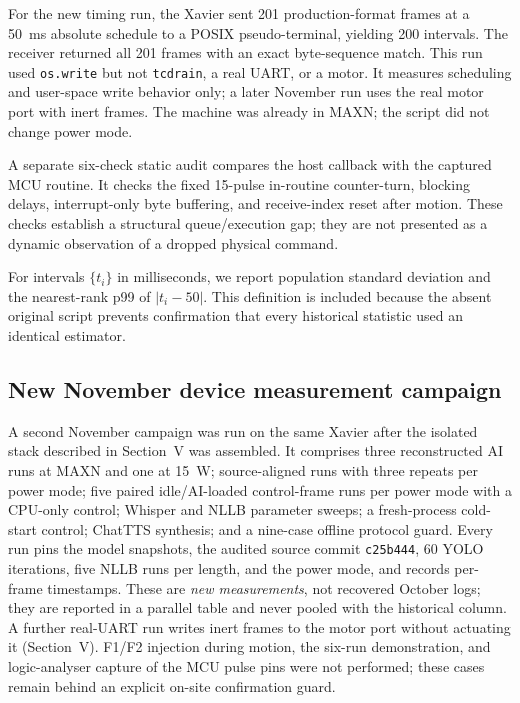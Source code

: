\documentclass[conference]{IEEEtran}
\newcommand{\code}[1]{\texttt{#1}}
\begin{document}
For the new timing run, the Xavier sent 201 production-format frames at a 50~ms absolute schedule to a POSIX pseudo-terminal, yielding 200 intervals. The receiver returned all 201 frames with an exact byte-sequence match. This run used \code{os.write} but not \code{tcdrain}, a real UART, or a motor. It measures scheduling and user-space write behavior only; a later November run uses the real motor port with inert frames. The machine was already in MAXN; the script did not change power mode.

A separate six-check static audit compares the host callback with the captured MCU routine. It checks the fixed 15-pulse in-routine counter-turn, blocking delays, interrupt-only byte buffering, and receive-index reset after motion. These checks establish a structural queue/execution gap; they are not presented as a dynamic observation of a dropped physical command.

For intervals $\{t_i\}$ in milliseconds, we report population standard deviation and the nearest-rank p99 of $|t_i-50|$. This definition is included because the absent original script prevents confirmation that every historical statistic used an identical estimator.

\subsection{New November device measurement campaign}
A second November campaign was run on the same Xavier after the isolated stack described in Section~V was assembled. It comprises three reconstructed AI runs at MAXN and one at 15~W; source-aligned runs with three repeats per power mode; five paired idle/AI-loaded control-frame runs per power mode with a CPU-only control; Whisper and NLLB parameter sweeps; a fresh-process cold-start control; ChatTTS synthesis; and a nine-case offline protocol guard. Every run pins the model snapshots, the audited source commit \code{c25b444}, 60 YOLO iterations, five NLLB runs per length, and the power mode, and records per-frame timestamps. These are \emph{new measurements}, not recovered October logs; they are reported in a parallel table and never pooled with the historical column. A further real-UART run writes inert frames to the motor port without actuating it (Section~V). F1/F2 injection during motion, the six-run demonstration, and logic-analyser capture of the MCU pulse pins were not performed; these cases remain behind an explicit on-site confirmation guard.
\end{document}
